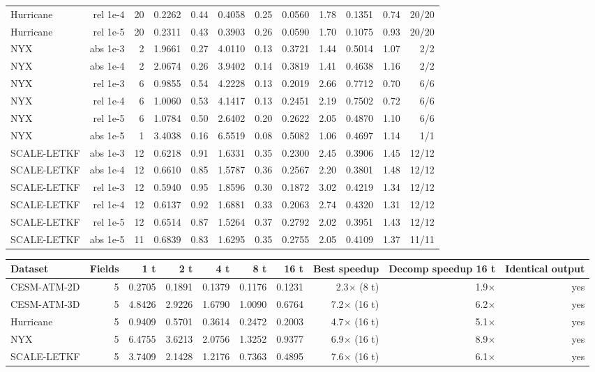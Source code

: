 \begin{tabular}{lrrrrrrrrrrr}
Hurricane & rel 1e-4 & 20 & 0.2262 & 0.44 & 0.4058 & 0.25 & 0.0560 & 1.78 & 0.1351 & 0.74 & 20/20 \\
Hurricane & rel 1e-5 & 20 & 0.2311 & 0.43 & 0.3903 & 0.26 & 0.0590 & 1.70 & 0.1075 & 0.93 & 20/20 \\
NYX & abs 1e-3 & 2 & 1.9661 & 0.27 & 4.0110 & 0.13 & 0.3721 & 1.44 & 0.5014 & 1.07 & 2/2 \\
NYX & abs 1e-4 & 2 & 2.0674 & 0.26 & 3.9402 & 0.14 & 0.3819 & 1.41 & 0.4638 & 1.16 & 2/2 \\
NYX & rel 1e-3 & 6 & 0.9855 & 0.54 & 4.2228 & 0.13 & 0.2019 & 2.66 & 0.7712 & 0.70 & 6/6 \\
NYX & rel 1e-4 & 6 & 1.0060 & 0.53 & 4.1417 & 0.13 & 0.2451 & 2.19 & 0.7502 & 0.72 & 6/6 \\
NYX & rel 1e-5 & 6 & 1.0784 & 0.50 & 2.6402 & 0.20 & 0.2622 & 2.05 & 0.4870 & 1.10 & 6/6 \\
NYX & abs 1e-5 & 1 & 3.4038 & 0.16 & 6.5519 & 0.08 & 0.5082 & 1.06 & 0.4697 & 1.14 & 1/1 \\
SCALE-LETKF & abs 1e-3 & 12 & 0.6218 & 0.91 & 1.6331 & 0.35 & 0.2300 & 2.45 & 0.3906 & 1.45 & 12/12 \\
SCALE-LETKF & abs 1e-4 & 12 & 0.6610 & 0.85 & 1.5787 & 0.36 & 0.2567 & 2.20 & 0.3801 & 1.48 & 12/12 \\
SCALE-LETKF & rel 1e-3 & 12 & 0.5940 & 0.95 & 1.8596 & 0.30 & 0.1872 & 3.02 & 0.4219 & 1.34 & 12/12 \\
SCALE-LETKF & rel 1e-4 & 12 & 0.6137 & 0.92 & 1.6881 & 0.33 & 0.2063 & 2.74 & 0.4320 & 1.31 & 12/12 \\
SCALE-LETKF & rel 1e-5 & 12 & 0.6514 & 0.87 & 1.5264 & 0.37 & 0.2792 & 2.02 & 0.3951 & 1.43 & 12/12 \\
SCALE-LETKF & abs 1e-5 & 11 & 0.6839 & 0.83 & 1.6295 & 0.35 & 0.2755 & 2.05 & 0.4109 & 1.37 & 11/11 \\
\bottomrule
\end{tabular}

\begin{tabular}{lrrrrrrrrr}
\toprule
\textbf{Dataset} & \textbf{Fields} & \textbf{1 t} & \textbf{2 t} & \textbf{4 t} & \textbf{8 t} & \textbf{16 t} & \textbf{Best speedup} & \textbf{Decomp speedup 16 t} & \textbf{Identical output} \\
\midrule
CESM-ATM-2D & 5 & 0.2705 & 0.1891 & 0.1379 & 0.1176 & 0.1231 & 2.3$\times$ (8 t) & 1.9$\times$ & yes \\
CESM-ATM-3D & 5 & 4.8426 & 2.9226 & 1.6790 & 1.0090 & 0.6764 & 7.2$\times$ (16 t) & 6.2$\times$ & yes \\
Hurricane & 5 & 0.9409 & 0.5701 & 0.3614 & 0.2472 & 0.2003 & 4.7$\times$ (16 t) & 5.1$\times$ & yes \\
NYX & 5 & 6.4755 & 3.6213 & 2.0756 & 1.3252 & 0.9377 & 6.9$\times$ (16 t) & 8.9$\times$ & yes \\
SCALE-LETKF & 5 & 3.7409 & 2.1428 & 1.2176 & 0.7363 & 0.4895 & 7.6$\times$ (16 t) & 6.1$\times$ & yes \\
\bottomrule
\end{tabular}

